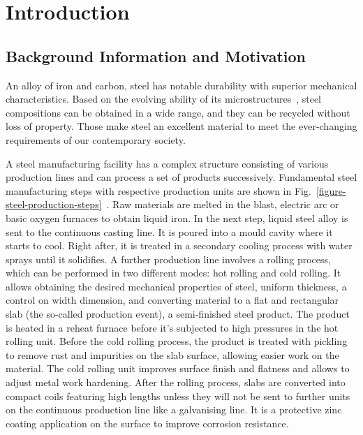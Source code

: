 \chapter{Introduction}

\section{Background Information and Motivation}\label{background_information}

An alloy of iron and carbon, steel has notable durability with superior mechanical characteristics. Based on the evolving ability of its microstructures~\cite{bhadeshia2017steels, Tasan2015}, steel compositions can be obtained in a wide range, and they can be recycled without loss of property. Those make steel an excellent material to meet the ever-changing requirements of our contemporary society.

A steel manufacturing facility has a complex structure consisting of various production lines and can process a set of products successively. Fundamental steel manufacturing steps with respective production units are shown in Fig.~\ref{figure-steel-production-steps}~\cite{sinha-spinks_2015}. Raw materials are melted in the blast, electric arc or basic oxygen furnaces to obtain liquid iron. In the next step, liquid steel alloy is sent to the continuous casting line. It is poured into a mould cavity where it starts to cool. Right after, it is treated in a secondary cooling process with water sprays until it solidifies. A further production line involves a rolling process, which can be performed in two different modes: hot rolling and cold rolling. It allows obtaining the desired mechanical properties of steel, uniform thickness, a control on width dimension, and converting material to a flat and rectangular slab (the so-called production event), a semi-finished steel product. The product is heated in a reheat furnace before it's subjected to high pressures in the hot rolling unit. Before the cold rolling process, the product is treated with pickling to remove rust and impurities on the slab surface, allowing easier work on the material. The cold rolling unit improves surface finish and flatness and allows to adjust metal work hardening. After the rolling process, slabs are converted into compact coils featuring high lengths unless they will not be sent to further units on the continuous production line like a galvanising line. It is a protective zinc coating application on the surface to improve corrosion resistance.

